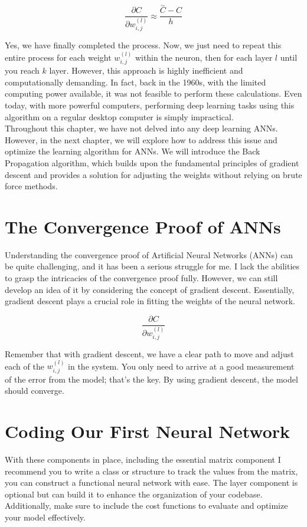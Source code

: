 \[
\frac{\partial C}{\partial w_{i, j}^{(l)}} \approx \frac{\overset{\sim}{C} - C}{h}
\]

Yes, we have finally completed the process. Now, we just need to repeat this entire process for each
weight $w_{i, j}^{(l)}$ within the neuron, then for each layer $l$ until you reach $k$ layer. However,
this approach is highly inefficient and computationally demanding. In fact, back in the 1960s, with the
limited computing power available, it was not feasible to perform these calculations. Even today, with
more powerful computers, performing deep learning tasks using this algorithm on a regular desktop computer
is simply impractical.\\

Throughout this chapter, we have not delved into any deep learning ANNs.
However, in the next chapter,
we will explore how to address this issue and optimize the learning algorithm for ANNs.
We will introduce the Back Propagation algorithm, which builds upon the fundamental principles of
gradient descent and provides a solution for adjusting the weights without relying on brute force methods.

\section{The Convergence Proof of ANNs}
Understanding the convergence proof of Artificial Neural Networks (ANNs) can be quite challenging, and it
has been a serious struggle for me. I lack the abilities to grasp the intricacies of the convergence proof
fully. However, we can still develop an idea of it by considering the concept of gradient descent.
Essentially, gradient descent plays a crucial role in fitting the weights of the neural network.

\[
\frac{\partial C}{\partial w_{i, j}^{(l)}}
\]

Remember that with gradient descent, we have a clear path to move and adjust each of the $w_{i, j}^{(l)}$ in the
system. You only need to arrive at a good measurement of the error from the model; that's the key. By using
gradient descent, the model should converge.

\section{Coding Our First Neural Network}
With these components in place, including the essential matrix component
I recommend you to write a class or structure to track the values from the matrix, you can construct a functional
neural network with ease. The layer component is optional but can build it to enhance the organization of
your codebase.
Additionally, make sure to include the cost functions to evaluate and optimize your model effectively.

